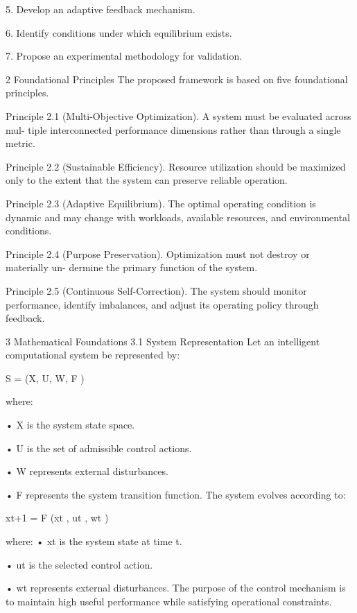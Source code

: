 \documentclass[10pt,a4paper]{article}
\begin{document}
\begin{ManuscriptText}
    5. Develop an adaptive feedback mechanism.

    6. Identify conditions under which equilibrium exists.

    7. Propose an experimental methodology for validation.


2     Foundational Principles
The proposed framework is based on five foundational principles.

Principle 2.1 (Multi-Objective Optimization). A system must be evaluated across mul-
tiple interconnected performance dimensions rather than through a single metric.

Principle 2.2 (Sustainable Efficiency). Resource utilization should be maximized only to
the extent that the system can preserve reliable operation.

Principle 2.3 (Adaptive Equilibrium). The optimal operating condition is dynamic and
may change with workloads, available resources, and environmental conditions.

Principle 2.4 (Purpose Preservation). Optimization must not destroy or materially un-
dermine the primary function of the system.

Principle 2.5 (Continuous Self-Correction). The system should monitor performance,
identify imbalances, and adjust its operating policy through feedback.


3     Mathematical Foundations
3.1     System Representation
Let an intelligent computational system be represented by:

                                     S = (X, U, W, F )

    where:


  • X is the system state space.

  • U is the set of admissible control actions.

  • W represents external disturbances.

  • F represents the system transition function.
   The system evolves according to:

                                   xt+1 = F (xt , ut , wt )

   where:
  • xt is the system state at time t.

  • ut is the selected control action.

  • wt represents external disturbances.
    The purpose of the control mechanism is to maintain high useful performance while
satisfying operational constraints.



\end{ManuscriptText}
\end{document}
